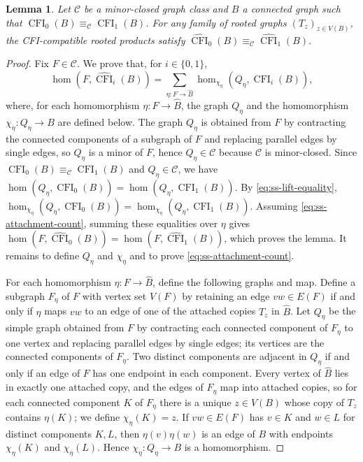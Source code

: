 \documentclass[10pt,a4paper]{article}
\theoremstyle{plain}
\newtheorem{lemma}[theorem]{Lemma}
\theoremstyle{definition}
\DeclareMathOperator{\CFI}{CFI}
\begin{document}
\begin{lemma}\label{lem:ss-attachments}
Let $\mathcal C$ be a minor-closed graph class and $B$ a connected graph
such that $\CFI_0(B)\equiv_{\mathcal C}\CFI_1(B)$.
For any family of rooted graphs $(T_z)_{z\in V(B)}$, the CFI-compatible
rooted products satisfy
$\widehat{\CFI}_0(B)\equiv_{\mathcal C}\widehat{\CFI}_1(B)$.
\end{lemma}
\begin{proof}
Fix $F\in\mathcal C$.
We prove that, for $i\in\{0,1\}$,
\begin{equation}\label{eq:ss-attachment-count}
 \hom(F,\widehat{\CFI}_i(B))=
 \sum_{\eta:F\to\widehat B}\hom_{\chi_\eta}(Q_\eta,\CFI_i(B)),
\end{equation}
where, for each homomorphism $\eta:F\to\widehat B$, the graph $Q_\eta$
and the homomorphism $\chi_\eta:Q_\eta\to B$ are defined below.
The graph $Q_\eta$ is obtained from $F$ by contracting the connected
components of a subgraph of $F$ and replacing parallel edges by single edges, so
$Q_\eta$ is a minor of $F$, hence $Q_\eta\in\mathcal C$ because
$\mathcal C$ is minor-closed.
Since $\CFI_0(B)\equiv_{\mathcal C}\CFI_1(B)$ and $Q_\eta\in\mathcal C$,
we have $\hom(Q_\eta,\CFI_0(B))=\hom(Q_\eta,\CFI_1(B))$.
By \cref{eq:ss-lift-equality},
$\hom_{\chi_\eta}(Q_\eta,\CFI_0(B))=\hom_{\chi_\eta}(Q_\eta,\CFI_1(B))$.
Assuming \cref{eq:ss-attachment-count}, summing these equalities over $\eta$
gives $\hom(F,\widehat{\CFI}_0(B))=\hom(F,\widehat{\CFI}_1(B))$, which
proves the lemma.
It remains to define $Q_\eta$ and $\chi_\eta$ and to prove
\cref{eq:ss-attachment-count}.

For each homomorphism $\eta:F\to\widehat B$, define the following graphs and map.
Define a subgraph $F_\eta$ of $F$
with vertex set $V(F)$ by retaining an edge $vw\in E(F)$ if and only if
$\eta$ maps $vw$ to an edge of one of the attached copies $T_z$ in $\widehat B$.
Let $Q_\eta$ be the simple graph obtained from $F$ by contracting each
connected component of $F_\eta$ to one vertex and replacing parallel
edges by single edges; its vertices are the connected components of $F_\eta$.
Two distinct components are adjacent in $Q_\eta$ if and only if an edge of
$F$ has one endpoint in each component.
Every vertex of $\widehat B$ lies in exactly one attached copy, and the
edges of $F_\eta$ map into attached copies, so for each connected
component $K$ of $F_\eta$ there is a unique $z\in V(B)$ whose copy of
$T_z$ contains $\eta(K)$; we define $\chi_\eta(K)=z$.
If $vw\in E(F)$ has $v\in K$ and $w\in L$ for distinct components $K,L$, then
$\eta(v)\eta(w)$ is an edge of $B$ with endpoints $\chi_\eta(K)$ and
$\chi_\eta(L)$.
Hence $\chi_\eta:Q_\eta\to B$ is a homomorphism.


\end{proof}
\end{document}
